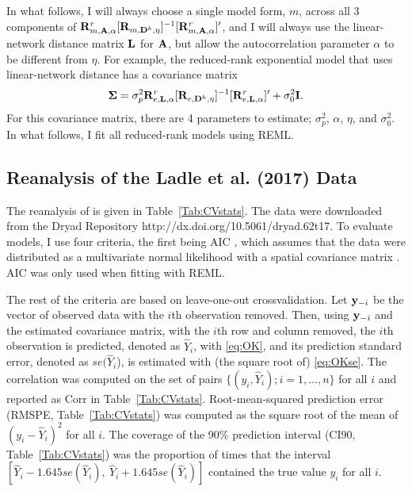 \documentclass[11pt, titlepage]{article}\usepackage[]{graphicx}\usepackage[]{color}
\begin{document}
\begin{spacing}{1.9}
\begin{flushleft}
\begin{enumerate}
\end{enumerate}

In what follows, I will always choose a single model form, $m$, across all 3 components of $\mathbf{R}^r_{m,\mathbf{A},\alpha}[\mathbf{R}_{m,\mathbf{D}^k,\eta}]^{-1}[\mathbf{R}^r_{m,\mathbf{A},\alpha}]^{\prime}$, and I will always use the linear-network distance matrix $\mathbf{L}$ for $\mathbf{A}$, but allow the autocorrelation parameter $\alpha$ to be different from $\eta$.  For example, the reduced-rank exponential model that uses linear-network distance has a covariance matrix
\begin{equation} \label{eq:RRmodCov}
				\mbox{\boldmath $\Sigma$} = \sigma^2_p\mathbf{R}^r_{e,\mathbf{L},\alpha}[\mathbf{R}_{e,\mathbf{D}^k,\eta}]^{-1}[\mathbf{R}^r_{e,\mathbf{L},\alpha}]^{\prime} + \sigma^2_0\mathbf{I}.
\end{equation}
For this covariance matrix, there are 4 parameters to estimate; $\sigma^2_p$, $\alpha$, $\eta$, and $\sigma^2_0$.  In what follows, I fit all reduced-rank models using REML.

\subsection*{Reanalysis of the Ladle et al. (2017) Data}

The reanalysis of \citet{Ladl:Avga:Whea:Boyc:pred:2016} is given in Table~\ref{Tab:CVstats}. The data were downloaded from the Dryad Repository http://dx.doi.org/10.5061/dryad.62t17.  To evaluate models, I use four criteria, the first being AIC \citep{Akai:Info:1973,Burn:Ande:mode:2002}, which assumes that the data were distributed as a multivariate normal likelihood with a spatial covariance matrix \citep[for an example using spatial models, see][]{Hoet:Davi:Mert:Thom:mode:2006}.  AIC was only used when fitting with REML.   

The rest of the criteria are based on leave-one-out crossvalidation.  Let $\mathbf{y}_{-i}$ be the vector of observed data with the $i$th observation removed. Then, using $\mathbf{y}_{-i}$ and the estimated covariance matrix, with the $i$th row and column removed, the $i$th observation is predicted, denoted as $\hat{Y}_i$,  with \ref{eq:OK}, and its prediction standard error, denoted as $se(\hat{Y}_i$), is estimated with (the square root of) \ref{eq:OKse}. The correlation was computed on the set of pairs $\{(y_i,\hat{Y}_i); i = 1,\ldots,n \}$ for all $i$ and reported as Corr in Table~\ref{Tab:CVstats}.  Root-mean-squared prediction error (RMSPE, Table~\ref{Tab:CVstats}) was computed as the square root of the mean of $(y_i-\hat{Y}_i)^2$ for all $i$. The coverage of the 90\% prediction interval (CI90, Table~\ref{Tab:CVstats}) was the proportion of times that the interval $[\hat{Y}_i - 1.645 se(\hat{Y}_i), \ \hat{Y}_i + 1.645 se(\hat{Y}_i)]$ contained the true value $y_i$ for all $i$.


\end{flushleft}
\end{spacing}
\end{document}
